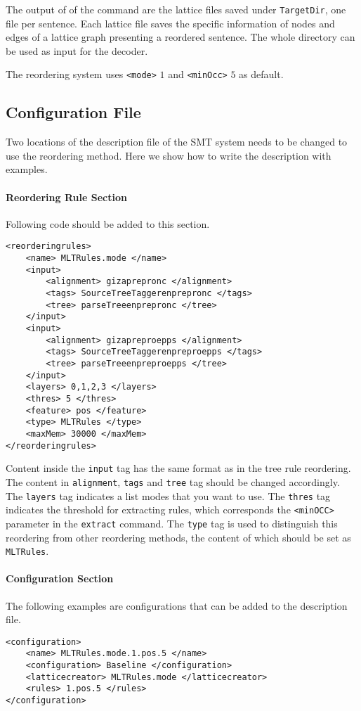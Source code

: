 The output of of the command are the lattice files saved under \verb|TargetDir|, one file per sentence. Each lattice file saves the specific information of nodes and edges of a lattice graph presenting a reordered sentence. The whole directory can be used as input for the decoder.

The reordering system uses \verb|<mode>| $1$ and \verb|<minOcc>| $5$ as default.

\subsection{Configuration File}

Two locations of the description file of the SMT system needs to be changed to use the reordering method. Here we show how to write the description with examples.

\paragraph{Reordering Rule Section}
Following code should be added to this section.

\begin{Verbatim}[frame=single]
<reorderingrules>
    <name> MLTRules.mode </name>
    <input>
        <alignment> gizaprepronc </alignment>
        <tags> SourceTreeTaggerenprepronc </tags>
        <tree> parseTreeenprepronc </tree>
    </input>
    <input>
        <alignment> gizapreproepps </alignment>
        <tags> SourceTreeTaggerenpreproepps </tags>
        <tree> parseTreeenpreproepps </tree>
    </input>
    <layers> 0,1,2,3 </layers>
    <thres> 5 </thres>
    <feature> pos </feature>
    <type> MLTRules </type>
    <maxMem> 30000 </maxMem>
</reorderingrules>
\end{Verbatim}
Content inside the \verb|input| tag has the same format as in the tree rule reordering. The content in \verb|alignment|, \verb|tags| and \verb|tree| tag should be changed accordingly. The \verb|layers| tag indicates a list modes that you want to use. The \verb|thres| tag indicates the threshold for extracting rules, which corresponds the \verb|<minOCC>| parameter in the \verb|extract| command. The \verb|type| tag is used to distinguish this reordering from other reordering methods, the content of which should be set as \verb|MLTRules|.

\paragraph{Configuration Section}
The following examples are configurations that can be added to the description file.
\begin{Verbatim}[frame=single]
<configuration>
    <name> MLTRules.mode.1.pos.5 </name>
    <configuration> Baseline </configuration>
    <latticecreator> MLTRules.mode </latticecreator>
    <rules> 1.pos.5 </rules>
</configuration>
\end{Verbatim}

